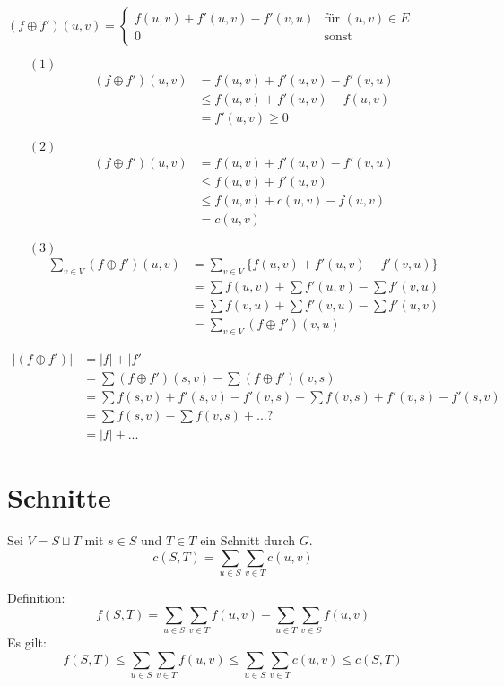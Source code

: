 \documentclass[a4paper,draft,twoside,10pt]{report}
\begin{document}
$(f\oplus f')(u,v)=\left\{\begin{array}{ll}
f(u,v)+f'(u,v)-f'(v,u)&\mbox{für } (u,v)\in E\\
0&\mbox{sonst}
\end{array}
\right.$
\begin{itemize}
\item[$(1)$]\begin{align*}(f\oplus f')(u,v)&=f(u,v)+f'(u,v)-f'(v,u)\\ &\le f(u,v)+f'(u,v)-f(u,v)\\ &=f'(u,v)\ge 0\end{align*}
\item[$(2)$]\begin{align*}(f\oplus f')(u,v)&=f(u,v)+f'(u,v)-f'(v,u)\\ &\le f(u,v)+f'(u,v)\\ &\le f(u,v)+c(u,v)-f(u,v)\\&=c(u,v)\end{align*}
\item[$(3)$]\begin{align*}\sum_{v\in V}(f\oplus f')(u,v)&=\sum_{v\in V}\{f(u,v)+f'(u,v)-f'(v,u)\}\\
&=\sum f(u,v)+\sum f'(u,v)-\sum f'(v,u)\\
&=\sum f(v,u)+\sum f'(v,u) -\sum f'(u,v)\\
&=\sum_{v\in V}(f\oplus f')(v,u)\end{align*}
\end{itemize}

\begin{align*}
|(f\oplus f')|&= |f|+|f'|\\
&=\sum (f\oplus f')(s,v)-\sum (f\oplus f')(v,s)\\
&=\sum f(s,v)+f'(s,v)-f'(v,s)-\sum f(v,s)+f'(v,s)-f'(s,v)\\
&=\sum f(s,v)-\sum f(v,s)+...?\\
&=|f|+...
\end{align*}

\section{Schnitte}
Sei $V=S\sqcup T$ mit $s\in S$ und $T\in T$ ein Schnitt durch $G$.
\[c(S,T)= \sum_{u\in S}\sum_{v\in T}c(u,v)\]

Definition:
\[f(S,T)= \sum_{u\in S}\sum_{v\in T}f(u,v)- \sum_{u\in T}\sum_{v\in S}f(u,v)\]
Es gilt:\[f(S,T)\le  \sum_{u\in S}\sum_{v\in T}f(u,v)\le  \sum_{u\in S}\sum_{v\in T}c(u,v)\le c(S,T)\]
\end{document}
